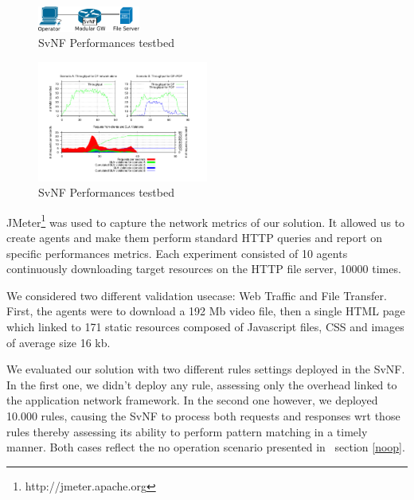 \begin{figure}
  \begin{center}
    \includegraphics[width=0.30\textwidth]{fig/testbed.pdf}
  \end{center}
  \caption{ SvNF Performances testbed
    \label{fig:testbed}
  }
\end{figure}	


\begin{figure}
  \begin{center}
    \includegraphics[width=0.5\textwidth]{fig/CP+POP_evaluation.pdf}
  \end{center}
  \caption{ SvNF Performances testbed
    \label{fig:cppopeval}
  }
\end{figure}	







JMeter\footnote{http://jmeter.apache.org} was used to capture the network metrics of our solution.
It allowed us to create agents and make them perform standard HTTP queries and report on specific performances metrics. Each experiment consisted of 10 agents continuously downloading target resources on the HTTP file server, 10000 times.

We considered two different validation usecase: Web Traffic and File Transfer. First, the agents were to download a 192 Mb video file, then a single HTML page which linked to 171 static resources composed of Javascript files, CSS and images of average size 16 kb.

We evaluated our solution with two different rules settings deployed in the SvNF. In the first one, we didn't deploy any rule, assessing only the overhead linked to the application network framework. In the second one however, we deployed 10.000 rules, causing the SvNF to process both requests and responses wrt those rules thereby assessing its ability to perform pattern matching in a timely manner. Both cases reflect the no operation scenario presented in ~section \ref{noop}.

